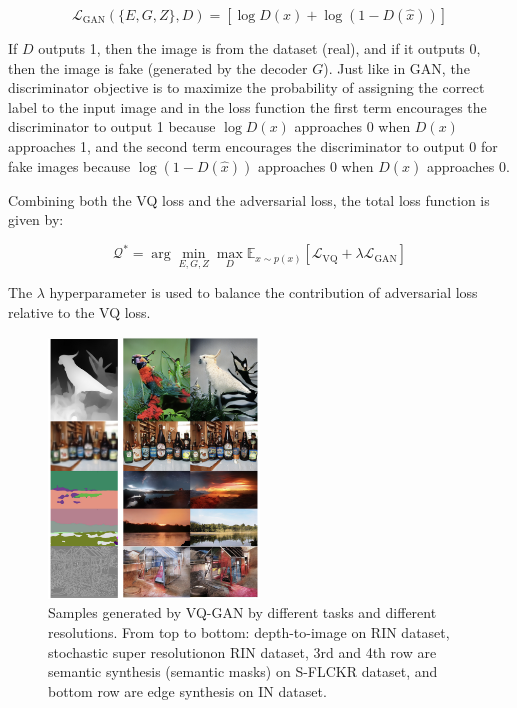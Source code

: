 \begin{equation}
    \mathcal{L}_{\text{GAN}}(\{E,G,Z\}, D) = [\log D(x) + \log (1-D(\hat{x}))]
\end{equation}

If $D$ outputs 1, then the image is from the dataset (real), and if it outputs 0, then the image is fake (generated by the decoder $G$). Just like in GAN, the discriminator objective is to maximize the probability of assigning the correct label to the input image and in the loss function the first term encourages the discriminator to output 1 because $\log D(x)$ approaches 0 when $D(x)$ approaches 1, and the second term encourages the discriminator to output 0 for fake images because $\log (1-D(\hat{x}))$ approaches 0 when $D(\hat{x})$ approaches 0.

Combining both the VQ loss and the adversarial loss, the total loss function is given by:

\begin{equation}
    \mathcal{Q^*} = \arg \min_{E, G, Z} \max_D \mathbb{E}_{x \sim p(x)} [\mathcal{L}_{\text{VQ}} + \lambda \mathcal{L}_{\text{GAN}}]
\end{equation}

The $\lambda$ hyperparameter is used to balance the contribution of adversarial loss relative to the VQ loss.

\begin{figure}
    \centering
    \includegraphics[width=0.5\textwidth]{images/vqgan_samples2.png}
    \caption[Caption for LOF]{Samples generated by VQ-GAN by different tasks and different resolutions. From top to bottom: depth-to-image on RIN dataset, stochastic super resolution\footnotemark on RIN dataset, 3rd and 4th row are semantic synthesis (semantic masks) on S-FLCKR dataset, and bottom row are edge synthesis on IN dataset.}
\end{figure}


